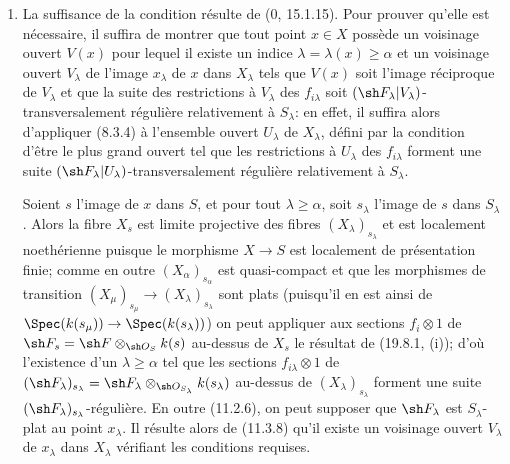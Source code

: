 \begin{enumerate}
  \item[(i)] La suffisance de la condition résulte de ($0$, 15.1.15). Pour prouver qu'elle est nécessaire, il suffira de montrer que tout point $x\in X$ possède un voisinage ouvert $V(x)$ pour lequel il existe un indice $\lambda=\lambda(x)\geq\alpha$ et un voisinage ouvert $V_\lambda$ de l'image $x_\lambda$ de $x$ dans $X_\lambda$ tels que $V(x)$ soit l'image réciproque de $V_\lambda$ et que la suite des restrictions à $V_\lambda$ des $f_{i\lambda}$ soit $(\sh F_\lambda|V_\lambda)$-transversalement régulière relativement à $S_\lambda$: en effet, il suffira alors d'appliquer (8.3.4) à l'ensemble ouvert $U_\lambda$ de $X_\lambda$, défini par la condition d'être le plus grand ouvert tel que les restrictions à $U_\lambda$ des $f_{i\lambda}$ forment une suite $(\sh F_\lambda|U_\lambda)$-transversalement régulière relativement à $S_\lambda$.

  Soient $s$ l'image de $x$ dans $S$, et pour tout $\lambda\geq\alpha$, soit $s_\lambda$ l'image de $s$ dans $S_\lambda$. Alors la fibre $X_s$ est limite projective des fibres $(X_\lambda)_{s_\lambda}$ et est localement noethérienne puisque le morphisme $X\to S$ est localement de présentation finie; comme en outre $(X_\alpha)_{s_\alpha}$ est quasi-compact et que les morphismes de transition $(X_\mu)_{s_\mu}\to(X_\lambda)_{s_\lambda}$ sont plats (puisqu'il en est ainsi de $\Spec(k(s_\mu))\to\Spec(k(s_\lambda))$) on peut appliquer aux sections $f_i\otimes1$ de $\sh F_s=\sh F\otimes_{\sh O_S}k(s)$ au-dessus de $X_s$ le résultat de (19.8.1, (i)); d'où l'existence d'un $\lambda\geq\alpha$ tel que les sections $f_{i\lambda}\otimes1$ de $(\sh F_\lambda)_{s_\lambda}=\sh F_\lambda\otimes_{\sh O_{S_\lambda}}k(s_\lambda)$ au-dessus de $(X_\lambda)_{s_\lambda}$ forment une suite $(\sh F_\lambda)_{s_\lambda}$-régulière. En outre (11.2.6), on peut supposer que $\sh F_\lambda$ est $S_\lambda$-plat au point $x_\lambda$. Il résulte alors de (11.3.8) qu'il existe un voisinage ouvert $V_\lambda$ de $x_\lambda$ dans $X_\lambda$ vérifiant les conditions requises.


\end{enumerate}
